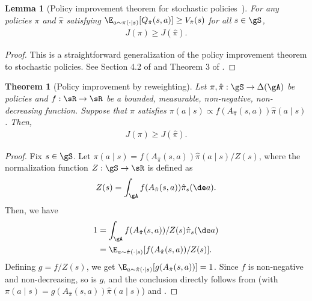 \documentclass{article}
\newtheorem{lemma}{Lemma}
\newtheorem{theorem}{Theorem}
\begin{document}
\begin{lemma}[Policy improvement theorem for stochastic policies~\citep{rl_sutton2005, rl_silva2023}] \label{lem:pit}
For any policies $\pi$ and $\hat \pi$ satisfying $\E_{a \sim \pi(\cdot \mid s)}[Q_{\hat \pi}(s, a)] \geq V_{\hat \pi}(s)$ for all $s \in \gS$,
\begin{align}
    J(\pi) \geq J(\hat \pi).
\end{align}
\end{lemma}
\begin{proof}
    This is a straightforward generalization of the policy improvement theorem to stochastic policies.
    See Section 4.2 of \citet{rl_sutton2005} and Theorem 3 of \citet{rl_silva2023}.
\end{proof}

\begin{theorem}[Policy improvement by reweighting] \label{thm:reweight}
Let $\pi, \hat \pi: \gS \to \Delta(\gA)$ be policies and $f: \sR \to \sR$ be a bounded, measurable, non-negative, non-decreasing function.
Suppose that $\pi$ satisfies $\pi(a \mid s) \propto f(A_{\hat{\pi}} (s, a)) \hat \pi(a \mid s)$.
Then,
\begin{align}
    J(\pi) \geq J(\hat \pi).
\end{align}
\end{theorem}
\begin{proof}
Fix $s \in \gS$.
Let $\pi(a \mid s) = f(A_{\hat \pi}(s, a))\hat \pi(a \mid s) / Z(s)$,
where the normalization function $Z: \gS \to \sR$ is defined as
\begin{align}
    Z(s) = \int_\gA f(A_{\hat \pi}(s, a)) \hat \pi_s(\de a).
\end{align}
Then, we have
\begin{align}
1 &= \int_\gA f(A_{\hat \pi}(s, a))/Z(s) \hat \pi_s(\de a) \\
&= \E_{a \sim \hat \pi(\cdot \mid s)}[f(A_{\hat \pi}(s, a))/Z(s)].
\end{align}
Defining $g = f / Z(s)$, we get $\E_{a \sim \hat \pi(\cdot \mid s)}[g(A_{\hat \pi}(s, a))] = 1$.
Since $f$ is non-negative and non-decreasing, so is $g$,
and the conclusion directly follows from 
(with $\pi(a \mid s) = g(A_{\hat{\pi}} (s, a)) \hat \pi(a \mid s)$)
and .
\end{proof}
\end{document}
